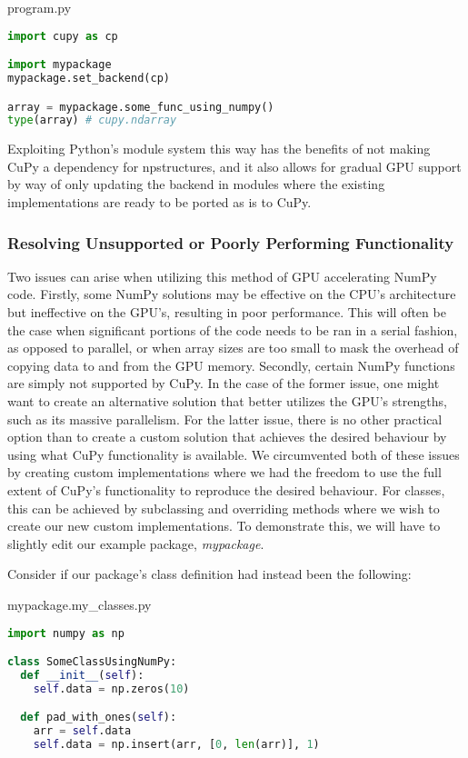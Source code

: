 \begin{center}
program.py
\end{center}
\begin{lstlisting}[language=Python,style=pycode]
import cupy as cp

import mypackage
mypackage.set_backend(cp)

array = mypackage.some_func_using_numpy()
type(array) # cupy.ndarray
\end{lstlisting}

Exploiting Python's module system this way has the benefits of not making CuPy a dependency for npstructures, and it also allows for gradual GPU support by way of only updating the backend in modules where the existing implementations are ready to be ported as is to CuPy.

\subsubsection{Resolving Unsupported or Poorly Performing Functionality}
Two issues can arise when utilizing this method of GPU accelerating NumPy code.
Firstly, some NumPy solutions may be effective on the CPU's architecture but ineffective on the GPU's, resulting in poor performance.
This will often be the case when significant portions of the code needs to be ran in a serial fashion, as opposed to parallel, or when array sizes are too small to mask the overhead of copying data to and from the GPU memory.
Secondly, certain NumPy functions are simply not supported by CuPy.
In the case of the former issue, one might want to create an alternative solution that better utilizes the GPU's strengths, such as its massive parallelism.
For the latter issue, there is no other practical option than to create a custom solution that achieves the desired behaviour by using what CuPy functionality is available.
We circumvented both of these issues by creating custom implementations where we had the freedom to use the full extent of CuPy's functionality to reproduce the desired behaviour.
For classes, this can be achieved by subclassing and overriding methods where we wish to create our new custom implementations.
To demonstrate this, we will have to slightly edit our example package, \textit{mypackage}.

Consider if our package's class definition had instead been the following:
\begin{center}
mypackage.my\_classes.py
\end{center}
\begin{lstlisting}[language=Python,style=pycode]
import numpy as np

class SomeClassUsingNumPy:
  def __init__(self):
    self.data = np.zeros(10)

  def pad_with_ones(self):
    arr = self.data
    self.data = np.insert(arr, [0, len(arr)], 1)
\end{lstlisting}

